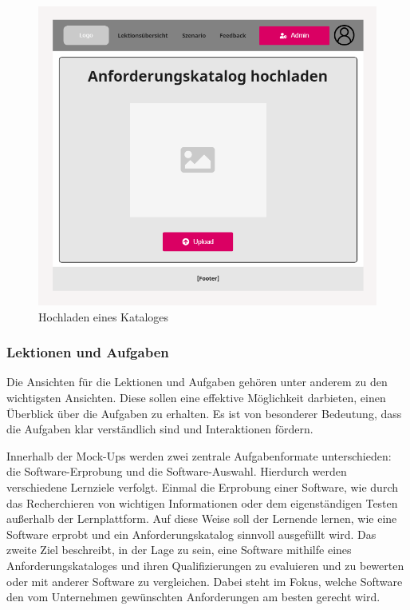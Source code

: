 \begin{figure}[H]
    \centering
    \includegraphics[width=1.0\textwidth]{assets/screenshots/mockups/KatalogUpload-MockUp.png}
    \caption{Hochladen eines Kataloges}
    \label{fig:Katalog_Hochladen}
\end{figure}

\subsubsection{Lektionen und Aufgaben}

Die Ansichten für die Lektionen und Aufgaben gehören unter anderem zu den wichtigsten Ansichten. Diese sollen eine effektive Möglichkeit darbieten, einen Überblick über die Aufgaben zu erhalten. Es ist von besonderer Bedeutung, dass die Aufgaben klar verständlich sind und Interaktionen fördern. 

Innerhalb der Mock-Ups werden zwei zentrale Aufgabenformate unterschieden: die Software-Erprobung und die Software-Auswahl. 
Hierdurch werden verschiedene Lernziele verfolgt. Einmal die Erprobung einer Software, wie durch das Recherchieren von wichtigen Informationen oder dem eigenständigen Testen außerhalb der Lernplattform. Auf diese Weise soll der Lernende lernen, wie eine Software erprobt und ein Anforderungskatalog sinnvoll ausgefüllt wird. Das zweite Ziel beschreibt, in der Lage zu sein, eine Software mithilfe eines Anforderungskataloges und ihren Qualifizierungen zu evaluieren und zu bewerten oder mit anderer Software zu vergleichen. Dabei steht im Fokus, welche Software den vom Unternehmen gewünschten Anforderungen am besten gerecht wird.

